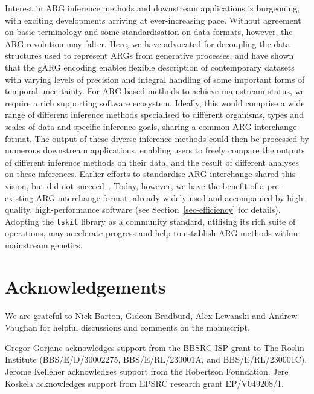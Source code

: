 \documentclass{article}
\begin{document}
Interest in ARG inference methods and downstream applications is
burgeoning, with exciting developments arriving at ever-increasing pace.
Without agreement on basic terminology and some standardisation
on data formats, however, the ARG revolution may falter.
Here, we have advocated
for decoupling the data structures used to represent ARGs
from generative processes, and have shown that the
gARG encoding enables flexible description of
contemporary datasets with varying levels of precision and integral
handling of some important forms of temporal uncertainty.
For ARG-based methods to achieve mainstream status, we require
a rich supporting software ecosystem.
Ideally, this would comprise a wide range of different
inference methods specialised to different organisms, types
and scales of data and
specific inference goals, sharing a common ARG interchange format.
The output of these diverse inference methods could then be
processed by numerous downstream applications,
enabling users to freely compare the outputs of different
inference methods on their data, and the result of different
analyses on these inferences.
Earlier efforts to standardise ARG interchange shared
this vision,
but did not succeed~\citep{cardona2008extended,mcgill2013graphml}.
Today, however, we have the benefit of a pre-existing ARG
interchange format, already widely used and accompanied
by high-quality, high-performance software
(see Section~\ref{sec-efficiency} for details).
Adopting the \texttt{tskit} library
as a community standard,
utilising its rich suite of operations,
may accelerate progress and help to
establish ARG methods within mainstream genetics.

\section*{Acknowledgements}
We are grateful to Nick Barton, Gideon Bradburd, Alex Lewanski and Andrew Vaughan
for helpful discussions and comments on the manuscript.

Gregor Gorjanc acknowledges support from the BBSRC ISP grant to The Roslin Institute (BBS/E/D/30002275, BBS/E/RL/230001A, and BBS/E/RL/230001C).
Jerome Kelleher acknowledges support from the Robertson Foundation.
Jere Koskela acknowledges support from EPSRC research grant EP/V049208/1.
\end{document}
